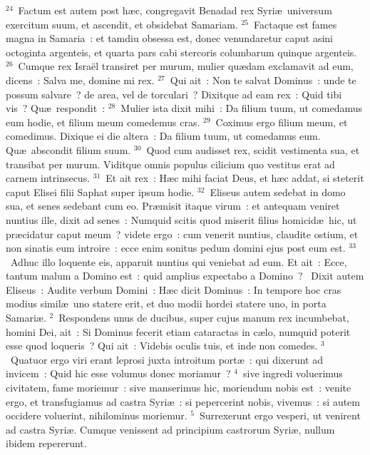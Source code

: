 ${}^{24}$~Factum est autem post h\ae c, congregavit Benadad rex Syri\ae\ universum exercitum suum, et ascendit, et obsidebat Samariam.
${}^{25}$~Factaque est fames magna in Samaria~: et tamdiu obsessa est, donec venundaretur caput asini octoginta argenteis, et quarta pars cabi stercoris columbarum quinque argenteis.
${}^{26}$~Cumque rex Isra\"el transiret per murum, mulier qu\ae dam exclamavit ad eum, dicens~: Salva me, domine mi rex.
${}^{27}$~Qui ait~: Non te salvat Dominus~: unde te possum salvare~? de area, vel de torculari~? Dixitque ad eam rex~: Quid tibi vis~? Qu\ae\ respondit~:
${}^{28}$~Mulier ista dixit mihi~: Da filium tuum, ut comedamus eum hodie, et filium meum comedemus cras.
${}^{29}$~Coximus ergo filium meum, et comedimus. Dixique ei die altera~: Da filium tuum, ut comedamus eum. Qu\ae\ abscondit filium suum.
${}^{30}$~Quod cum audisset rex, scidit vestimenta sua, et transibat per murum. Viditque omnis populus cilicium quo vestitus erat ad carnem intrinsecus.
${}^{31}$~Et ait rex~: H\ae c mihi faciat Deus, et h\ae c addat, si steterit caput Elisei filii Saphat super ipsum hodie.
${}^{32}$~Eliseus autem sedebat in domo sua, et senes sedebant cum eo. Pr\ae misit itaque virum~: et antequam veniret nuntius ille, dixit ad senes~: Numquid scitis quod miserit filius homicid\ae\ hic, ut pr\ae cidatur caput meum~? videte ergo~: cum venerit nuntius, claudite ostium, et non sinatis eum introire~: ecce enim sonitus pedum domini ejus post eum est.
${}^{33}$~Adhuc illo loquente eis, apparuit nuntius qui veniebat ad eum. Et ait~: Ecce, tantum malum a Domino est~: quid amplius expectabo a Domino~?
~\lettrine[lines=10,image=true,loversize=0.05,lraise=-0.03]{D}{}ixit autem Eliseus~: Audite verbum Domini~: H\ae c dicit Dominus~: In tempore hoc cras modius simil\ae\ uno statere erit, et duo modii hordei statere uno, in porta Samari\ae .
${}^{2}$~Respondens unus de ducibus, super cujus manum rex incumbebat, homini Dei, ait~: Si Dominus fecerit etiam cataractas in c\ae lo, numquid poterit esse quod loqueris~? Qui ait~: Videbis oculis tuis, et inde non comedes.
${}^{3}$~Quatuor ergo viri erant leprosi juxta introitum port\ae~: qui dixerunt ad invicem~: Quid hic esse volumus donec moriamur~?
${}^{4}$~sive ingredi voluerimus civitatem, fame moriemur~: sive manserimus hic, moriendum nobis est~: venite ergo, et transfugiamus ad castra Syri\ae~: si pepercerint nobis, vivemus~: si autem occidere voluerint, nihilominus moriemur.
${}^{5}$~Surrexerunt ergo vesperi, ut venirent ad castra Syri\ae . Cumque venissent ad principium castrorum Syri\ae , nullum ibidem repererunt.

